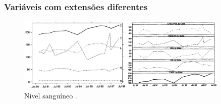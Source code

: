 \begin{frame}
\frametitle{Variáveis com extensões diferentes}
\begin{figure}[h]
 \centering
  \includegraphics[width=0.9\textwidth,height=0.7\textheight,keepaspectratio]{figures/range.png}
 \caption{Nível sanguíneo \cite{robbins_creating_2013}.}
 \label{fig-range}
\end{figure}
\end{frame}


